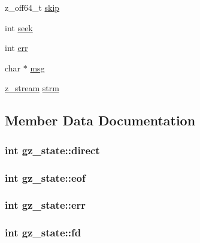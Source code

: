 \begin{DoxyCompactItemize}
\item 
z\+\_\+off64\+\_\+t \hyperlink{structgz__state_a4bc336eac6a48fd0f2645e672e5c6c13}{skip}
\item 
int \hyperlink{structgz__state_ab60b82012b8193c3f44b2e48974b9dd9}{seek}
\item 
int \hyperlink{structgz__state_aa9832eb9300c065f6572e5699ab27938}{err}
\item 
char $\ast$ \hyperlink{structgz__state_ad49f321739e10ff0387a0e7fe31c6538}{msg}
\item 
\hyperlink{zlib_8h_afa60092f4e0b9bc4f23b41c6930463f0}{z\+\_\+stream} \hyperlink{structgz__state_a77df647f4deba86cc8a4fa0a01a08f4e}{strm}
\end{DoxyCompactItemize}


\subsection{Member Data Documentation}
\hypertarget{structgz__state_a114c6a0de43039853ead48a092792a7d}{}
\subsubsection[{direct}]{\setlength{\rightskip}{0pt plus 5cm}int gz\+\_\+state\+::direct}\label{structgz__state_a114c6a0de43039853ead48a092792a7d}
\hypertarget{structgz__state_ae50ffc823858bc4f909e3d9507356f92}{}
\subsubsection[{eof}]{\setlength{\rightskip}{0pt plus 5cm}int gz\+\_\+state\+::eof}\label{structgz__state_ae50ffc823858bc4f909e3d9507356f92}
\hypertarget{structgz__state_aa9832eb9300c065f6572e5699ab27938}{}
\subsubsection[{err}]{\setlength{\rightskip}{0pt plus 5cm}int gz\+\_\+state\+::err}\label{structgz__state_aa9832eb9300c065f6572e5699ab27938}
\hypertarget{structgz__state_a5963abca9e640ff2aa40b517f9cffc2c}{}
\subsubsection[{fd}]{\setlength{\rightskip}{0pt plus 5cm}int gz\+\_\+state\+::fd}\label{structgz__state_a5963abca9e640ff2aa40b517f9cffc2c}
\hypertarget{structgz__state_ac6e4b7db699aacd089f6d55b01483d6f}{}
